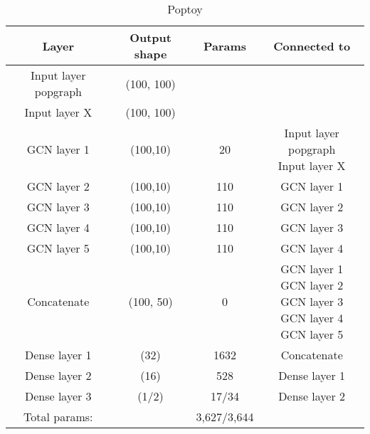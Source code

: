 \begin{table}[H]
    \centering
    \caption{Poptoy}
    \begin{tabular}{c|c c c}
         Layer & Output shape & Params & Connected to\\ \hline\hline
         Input layer popgraph &(100, 100) & & \\ \hline
         Input layer X &  (100, 100)& & \\ \hline
         GCN layer 1 & (100,10) & 20 & \thead{Input layer popgraph \\ Input layer X}   \\ \hline
         GCN layer 2 & (100,10)& 110 & GCN layer 1\\ \hline
         GCN layer 3 & (100,10)& 110  &GCN layer 2\\ \hline
         GCN layer 4 & (100,10)& 110  &GCN layer 3\\ \hline
         GCN layer 5 & (100,10)& 110  &GCN layer 4\\ \hline
         Concatenate & (100, 50)  & 0 & \thead{GCN layer 1\\GCN layer 2\\GCN layer 3\\GCN layer 4\\GCN layer 5} \\ \hline
         Dense layer 1& (32) & 1632 & Concatenate \\
         Dense layer 2& (16) & 528 & Dense layer 1\\
         Dense layer 3& (1/2) & 17/34 & Dense layer 2\\
         \hline\hline
         Total params:& & 3,627/3,644
    \end{tabular}
    \label{tab:Models_Poptoy}
\end{table}

